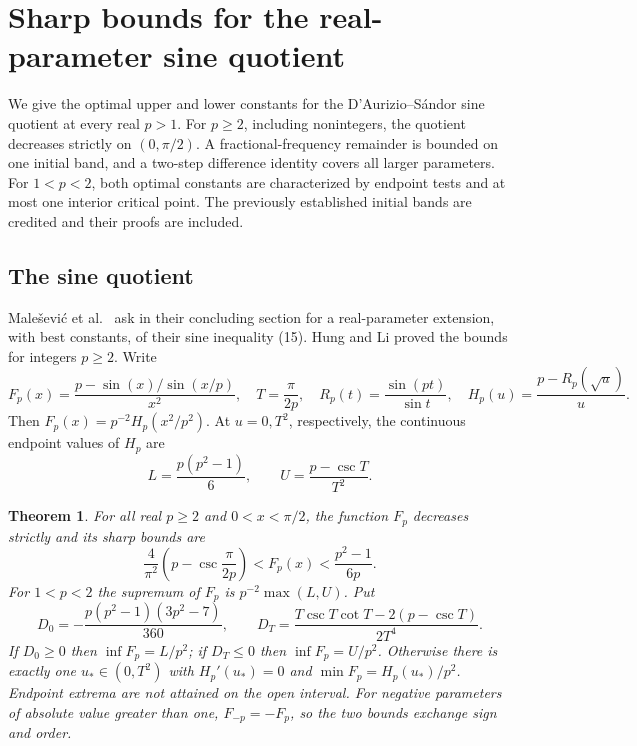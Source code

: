 \documentclass[11pt,a4paper]{article}
\numberwithin{equation}{section}
\newtheorem{theorem}{Theorem}[section]
\theoremstyle{definition}
\theoremstyle{remark}
\newenvironment{sectionabstract}{\par\smallskip\begingroup\small\noindent}{\par\endgroup\medskip}
\begin{document}
\par\endgroup

\begingroup
\newcommand{\sinc}{\operatorname{sinc}}
\section{\texorpdfstring{Sharp bounds for the real-parameter sine quotient}{Sharp bounds for the real-parameter sine quotient}}\label{section:r33showa}
\par\medskip

\begin{sectionabstract}
We give the optimal upper and lower constants for the D'Aurizio--S\'andor sine quotient at every real $p>1$. For $p\ge2$, including nonintegers, the quotient decreases strictly on $(0,\pi/2)$. A fractional-frequency remainder is bounded on one initial band, and a two-step difference identity covers all larger parameters. For $1<p<2$, both optimal constants are characterized by endpoint tests and at most one interior critical point. The previously established initial bands are credited and their proofs are included.
\end{sectionabstract}
\subsection{The sine quotient}
Male\v sevi\'c et al.\ \cite{r33showa:mm} ask in their concluding section for a real-parameter extension, with best constants, of their sine inequality (15). Hung and Li \cite{r33showa:hl} proved the bounds for integers $p\ge2$. Write
\[
F_p(x)=\frac{p-\sin(x)/\sin(x/p)}{x^2},\quad
T=\frac{\pi}{2p},\quad
R_p(t)=\frac{\sin(pt)}{\sin t},\quad H_p(u)=\frac{p-R_p(\sqrt{u})}{u}.
\]
Then $F_p(x)=p^{-2}H_p(x^2/p^2)$. At $u=0,T^2$, respectively, the continuous endpoint values of $H_p$ are
\[
L=\frac{p(p^2-1)}6,\qquad U=\frac{p-\csc T}{T^2}.
\]
\begin{theorem}
For all real $p\ge2$ and $0<x<\pi/2$, the function $F_p$ decreases strictly and its sharp bounds are
\[
\frac4{\pi^2}\left(p-\csc\frac\pi{2p}\right)< F_p(x)<\frac{p^2-1}{6p}.
\]
For $1<p<2$ the supremum of $F_p$ is $p^{-2}\max(L,U)$. Put
\[
 D_0=-\frac{p(p^2-1)(3p^2-7)}{360},\qquad
 D_T=\frac{T\csc T\cot T-2(p-\csc T)}{2T^4}.
\]
If $D_0\ge0$ then $\inf F_p=L/p^2$; if $D_T\le0$ then $\inf F_p=U/p^2$.
Otherwise there is exactly one $u_*\in(0,T^2)$ with $H_p'(u_*)=0$ and $\min F_p=H_p(u_*)/p^2$. Endpoint extrema are not attained on the open interval. For negative parameters of absolute value greater than one, $F_{-p}=-F_p$, so the two bounds exchange sign and order.
\end{theorem}
\end{document}
